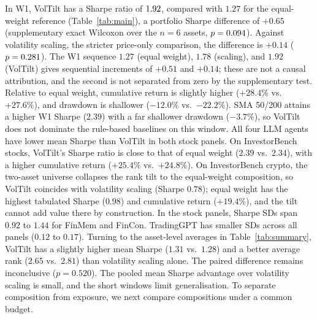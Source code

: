 In W1, VolTilt has a Sharpe ratio of $1.92$, compared with $1.27$ for the equal-weight reference (Table~\ref{tab:main}), a portfolio Sharpe difference of $+0.65$ (supplementary exact Wilcoxon over the $n=6$ assets, $p=0.094$). Against volatility scaling, the stricter price-only comparison, the difference is $+0.14$ ($p=0.281$). The W1 sequence $1.27$ (equal weight), $1.78$ (scaling), and $1.92$ (VolTilt) gives sequential increments of $+0.51$ and $+0.14$; these are not a causal attribution, and the second is not separated from zero by the supplementary test. Relative to equal weight, cumulative return is slightly higher ($+28.4\%$ vs.\ $+27.6\%$), and drawdown is shallower ($-12.0\%$ vs.\ $-22.2\%$). SMA 50/200 attains a higher W1 Sharpe ($2.39$) with a far shallower drawdown ($-3.7\%$), so VolTilt does not dominate the rule-based baselines on this window. All four LLM agents have lower mean Sharpe than VolTilt in both stock panels. On InvestorBench stocks, VolTilt's Sharpe ratio is close to that of equal weight ($2.39$ vs.\ $2.34$), with a higher cumulative return ($+25.4\%$ vs.\ $+24.8\%$). On InvestorBench crypto, the two-asset universe collapses the rank tilt to the equal-weight composition, so VolTilt coincides with volatility scaling (Sharpe $0.78$); equal weight has the highest tabulated Sharpe ($0.98$) and cumulative return ($+19.4\%$), and the tilt cannot add value there by construction. In the stock panels, Sharpe SDs span $0.92$ to $1.44$ for FinMem and FinCon. TradingGPT has smaller SDs across all panels ($0.12$ to $0.17$). Turning to the asset-level averages in Table~\ref{tab:summary}, VolTilt has a slightly higher mean Sharpe ($1.31$ vs.\ $1.28$) and a better average rank ($2.65$ vs.\ $2.81$) than volatility scaling alone. The paired difference remains inconclusive ($p=0.520$). The pooled mean Sharpe advantage over volatility scaling is small, and the short windows limit generalisation. To separate composition from exposure, we next compare compositions under a common budget.

